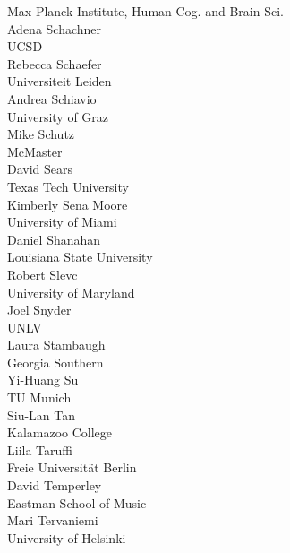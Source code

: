 \begin{multicols}{2}
\vspace{.5em}Max Planck Institute, Human Cog. and Brain Sci.\\
Adena Schachner\\
\vspace{.5em}UCSD\\
Rebecca Schaefer\\
\vspace{.5em}Universiteit Leiden\\
Andrea Schiavio\\
\vspace{.5em}University of Graz\\
Mike Schutz\\
\vspace{.5em}McMaster\\
David Sears\\
\vspace{.5em}Texas Tech University\\
Kimberly Sena Moore\\
\vspace{.5em}University of Miami\\
Daniel Shanahan\\
\vspace{.5em}Louisiana State University\\
Robert Slevc\\
\vspace{.5em}University of Maryland\\
Joel Snyder\\
\vspace{.5em}UNLV\\
Laura Stambaugh\\
\vspace{.5em}Georgia Southern\\
Yi-Huang Su\\
\vspace{.5em}TU Munich\\
Siu-Lan Tan\\
\vspace{.5em}Kalamazoo College\\
Liila Taruffi\\
\vspace{.5em}Freie Universit{\"a}t Berlin\\
David Temperley\\
\vspace{.5em}Eastman School of Music\\
Mari Tervaniemi\\
\vspace{.5em}University of Helsinki\\

\end{multicols}
